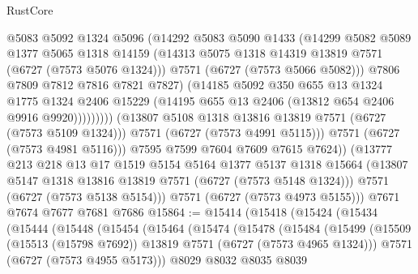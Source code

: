 \begin{lexlean}{RustCore}
\begin{coremodule}
                          @5083
                          @5092
                          @1324
                          @5096
                          (@14292
                            @5083
                            @5090
                            @1433
                            (@14299
                              @5082
                              @5089
                              @1377
                              @5065
                              @1318
                              @14159
                              (@14313 @5075 @1318 @14319 @13819 @7571 (@6727 (@7573 @5076 @1324)))
                              @7571
                              (@6727 (@7573 @5066 @5082)))
                            @7806
                            @7809
                            @7812
                            @7816
                            @7821
                            @7827)
                          (@14185
                            @5092
                            @350
                            @655
                            @13
                            @1324
                            @1775
                            @1324
                            @2406
                            @15229
                            (@14195 @655 @13 @2406 (@13812 @654 @2406 @9916 @9920)))))))))
              (@13807 @5108 @1318 @13816 @13819 @7571 (@6727 (@7573 @5109 @1324)))
              @7571
              (@6727 (@7573 @4991 @5115)))
            @7571
            (@6727 (@7573 @4981 @5116)))
          @7595
          @7599
          @7604
          @7609
          @7615
          @7624))
      (@13777
        @213
        @218
        @13
        @17
        @1519
        @5154
        @5164
        @1377
        @5137
        @1318
        @15664
        (@13807 @5147 @1318 @13816 @13819 @7571 (@6727 (@7573 @5148 @1324)))
        @7571
        (@6727 (@7573 @5138 @5154)))
      @7571
      (@6727 (@7573 @4973 @5155)))
    @7671
    @7674
    @7677
    @7681
    @7686
@15864 := @15414
    (@15418
      (@15424
        (@15434
          (@15444
            (@15448
              (@15454
                (@15464
                  (@15474
                    (@15478
                      (@15484
                        (@15499
                          (@15509 (@15513 (@15798 @7692)) @13819 @7571 (@6727 (@7573 @4965 @1324)))
                          @7571
                          (@6727 (@7573 @4955 @5173)))
                        @8029
                        @8032
                        @8035
                        @8039

\end{coremodule}
\end{lexlean}
